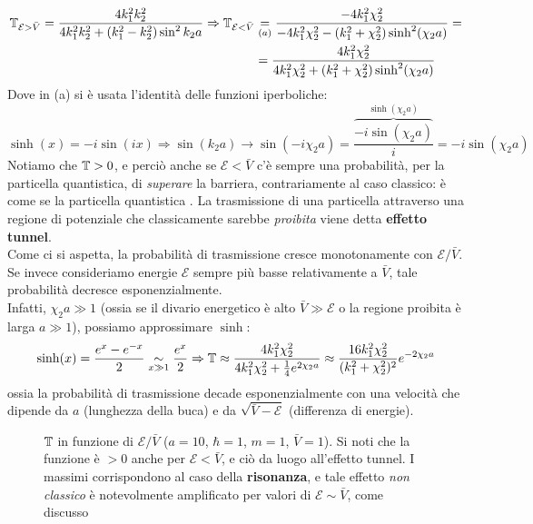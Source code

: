 \documentclass[../../FisicaTeorica.tex]{subfiles}
\begin{document}
\begin{align*}
\mathbb{T}_{\mathcal{E}>\bar{V}} = \frac{4k_1^2 k_2^2}{4k_1^2 k_2^2 + (k_1^2-k_2^2)\sin^2 k_2 a} \Rightarrow \mathbb{T}_{\mathcal{E}<\bar{V}}
&\underset{(a)}{=} \frac{-4k_1^2 \chi_2^2}{-4k_1^2 \chi_2^2 - (k_1^2+\chi_2^2)\sinh^2( \chi_2 a)} =\\
&=\frac{4k_1^2\chi_2^2}{4k_1^2\chi_2^2+(k_1^2+\chi_2^2)\sinh^2(\chi_2a)}
\end{align*}
Dove in (a) si è usata l'identità delle funzioni iperboliche:
\[
\sinh(x)=-i\sin(ix) \Rightarrow \sin(k_2 a) \to \sin(-i\chi_2a)=\frac{\overbrace{-i\sin(\chi_2a)}^{\sinh(\chi_2 a)}}{i}=-i\sin(\chi_2a)
\]
Notiamo che $\mathbb{T}>0$, e perciò anche se $\mathcal{E}<\bar{V}$ c'è sempre una probabilità, per la particella quantistica, di \textit{superare} la barriera, contrariamente al caso classico: è come se la particella quantistica . La trasmissione di una particella attraverso una regione di potenziale che classicamente sarebbe \textit{proibita} viene detta \textbf{effetto tunnel}.\\

Come ci si aspetta, la probabilità di trasmissione cresce monotonamente con $\mathcal{E}/\bar{V}$. Se invece consideriamo energie $\mathcal{E}$ sempre più basse relativamente a $\bar{V}$, tale probabilità decresce esponenzialmente.\\
Infatti, $\chi_2 a \gg 1$ (ossia se il divario energetico è alto $\bar{V}\gg\mathcal{E}$ o la regione proibita è larga $a\gg1$), possiamo approssimare $\sinh$:
\begin{equation}
\sinh(x)=\frac{e^x-e^{-x}}{2}\underset{x\gg1}{\sim}\frac{e^x}{2}\Rightarrow \mathbb{T}\approx\frac{4k_1^2\chi_2^2}{4k_1^2\chi_2^2+\frac{1}{4}e^{2\chi_2 a}}\approx\frac{16k_1^2\chi_2^2}{(k_1^2+\chi_2^2)^2}e^{-2\chi_2a}
\label{eqn:effetto_tunnel}
\end{equation}
ossia la probabilità di trasmissione decade esponenzialmente con una velocità che dipende da $a$ (lunghezza della buca) e da $\sqrt{\bar{V}-\mathcal{E}}$ (differenza di energie).\\
\begin{figure}[H]
\centering

\caption{$\mathbb{T}$ in funzione di $\mathcal{E}/\bar{V}$ ($a=10$, $\hbar=1$, $m=1$, $\bar{V}=1$). Si noti che la funzione è $>0$ anche per $\mathcal{E}<\bar{V}$, e ciò da luogo all'effetto tunnel. I massimi  corrispondono al caso della \textbf{risonanza}, e tale effetto \textit{non classico} è notevolmente amplificato per valori di $\mathcal{E}\sim \bar{V}$, come discusso}
\label{plot:TEsuV}
\end{figure}
\end{document}
